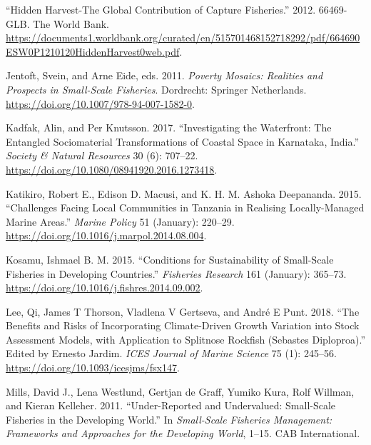 \documentclass[
]{article}
\newlength{\cslhangindent}
\newlength{\cslentryspacingunit} %
\newenvironment{CSLReferences}[2] %
 {%
  \setlength{\parindent}{0pt}
  \ifodd #1
  \let\oldpar\par
  \def\par{\hangindent=\cslhangindent\oldpar}
  \fi
  \setlength{\parskip}{#2\cslentryspacingunit}
 }%
 {}
\begin{document}
\begin{CSLReferences}{1}{0}
\leavevmode{}%
{``Hidden {Harvest}-{The} {Global} {Contribution} of {Capture} {Fisheries}.''} 2012. 66469-GLB. The World Bank. \url{https://documents1.worldbank.org/curated/en/515701468152718292/pdf/664690ESW0P1210120HiddenHarvest0web.pdf}.

\leavevmode{}%
Jentoft, Svein, and Arne Eide, eds. 2011. \emph{Poverty {Mosaics}: {Realities} and {Prospects} in {Small}-{Scale} {Fisheries}}. Dordrecht: Springer Netherlands. \url{https://doi.org/10.1007/978-94-007-1582-0}.

\leavevmode{}%
Kadfak, Alin, and Per Knutsson. 2017. {``Investigating the {Waterfront}: {The} {Entangled} {Sociomaterial} {Transformations} of {Coastal} {Space} in {Karnataka}, {India}.''} \emph{Society \& Natural Resources} 30 (6): 707--22. \url{https://doi.org/10.1080/08941920.2016.1273418}.

\leavevmode{}%
Katikiro, Robert E., Edison D. Macusi, and K. H. M. Ashoka Deepananda. 2015. {``Challenges Facing Local Communities in {Tanzania} in Realising Locally-Managed Marine Areas.''} \emph{Marine Policy} 51 (January): 220--29. \url{https://doi.org/10.1016/j.marpol.2014.08.004}.

\leavevmode{}%
Kosamu, Ishmael B. M. 2015. {``Conditions for Sustainability of Small-Scale Fisheries in Developing Countries.''} \emph{Fisheries Research} 161 (January): 365--73. \url{https://doi.org/10.1016/j.fishres.2014.09.002}.

\leavevmode{}%
Lee, Qi, James T Thorson, Vladlena V Gertseva, and André E Punt. 2018. {``The Benefits and Risks of Incorporating Climate-Driven Growth Variation into Stock Assessment Models, with Application to {Splitnose} {Rockfish} ({Sebastes} Diploproa).''} Edited by Ernesto Jardim. \emph{ICES Journal of Marine Science} 75 (1): 245--56. \url{https://doi.org/10.1093/icesjms/fsx147}.

\leavevmode{}%
Mills, David J., Lena Westlund, Gertjan de Graff, Yumiko Kura, Rolf Willman, and Kieran Kelleher. 2011. {``Under-Reported and {Undervalued}: {Small}-Scale {Fisheries} in the {Developing} {World}.''} In \emph{Small-Scale {Fisheries} {Management}: {Frameworks} and Approaches for the {Developing} {World}}, 1--15. CAB International.


\end{CSLReferences}
\end{document}
